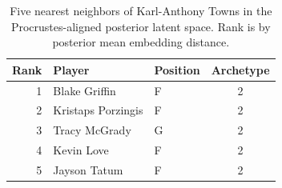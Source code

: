 \begin{table}[htbp]
  \centering\small
  \begin{tabular}{rllc}
    \toprule
    Rank & Player & Position & Archetype \\
    \midrule
    1 & Blake Griffin & F & 2 \\
    2 & Kristaps Porzingis & F & 2 \\
    3 & Tracy McGrady & G & 2 \\
    4 & Kevin Love & F & 2 \\
    5 & Jayson Tatum & F & 2 \\
    \bottomrule
  \end{tabular}
  \caption{Five nearest neighbors of Karl-Anthony Towns in the Procrustes-aligned posterior latent space. Rank is by posterior mean embedding distance.}
\end{table}

